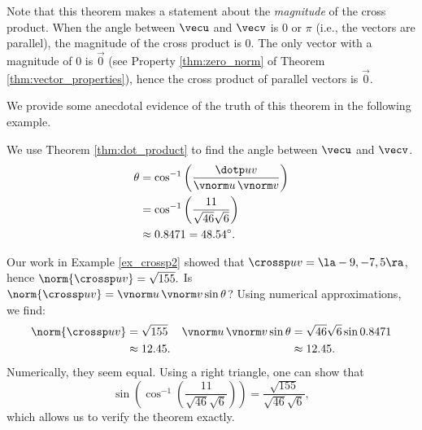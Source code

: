 Note that this theorem makes a statement about the \emph{magnitude} of the cross product. When the angle between $\vecu$ and $\vecv$ is 0 or $\pi$ (i.e., the vectors are parallel), the magnitude of the cross product is 0. The only vector with a magnitude of 0 is $\vec 0$ (see Property \ref{thm:zero_norm} of Theorem \ref{thm:vector_properties}), hence the cross product of  parallel vectors is $\vec 0$.

We provide some anecdotal evidence of the truth of this theorem in the following example.\\

{We use Theorem \ref{thm:dot_product} to find the angle between $\vecu$ and $\vecv$. 
\begin{align*}
\theta &= \cos^{-1}\left(\frac{\dotp uv}{\vnorm u\, \vnorm v}\right) \\
			&= \cos^{-1}\left(\frac{11}{\sqrt{46}\sqrt{6}}\right)\\
			&\approx 0.8471 = 48.54^\circ.
\end{align*}

Our work in Example \ref{ex_crossp2} showed that $\crossp uv = \la -9,-7,5\ra$, hence $\norm{\crossp uv} = \sqrt{155}.$ Is $\norm{\crossp uv} = \vnorm u\, \vnorm v\sin\theta$? Using numerical approximations, we find:
\begin{align*}
\norm{\crossp uv} &=\sqrt{155}  & \vnorm u\,\vnorm v \sin\theta & = \sqrt{46}\sqrt{6}\sin 0.8471\\
									&\approx 12.45. & &\approx 12.45.
\end{align*}
Numerically, they seem equal. Using a right triangle, one can show that 
\[
\sin\left(\cos^{-1}\left(\frac{11}{\sqrt{46}\sqrt{6}}\right)\right) = \frac{\sqrt{155}}{\sqrt{46}\sqrt{6}},
\]
which allows us to verify the theorem exactly.
}\\

